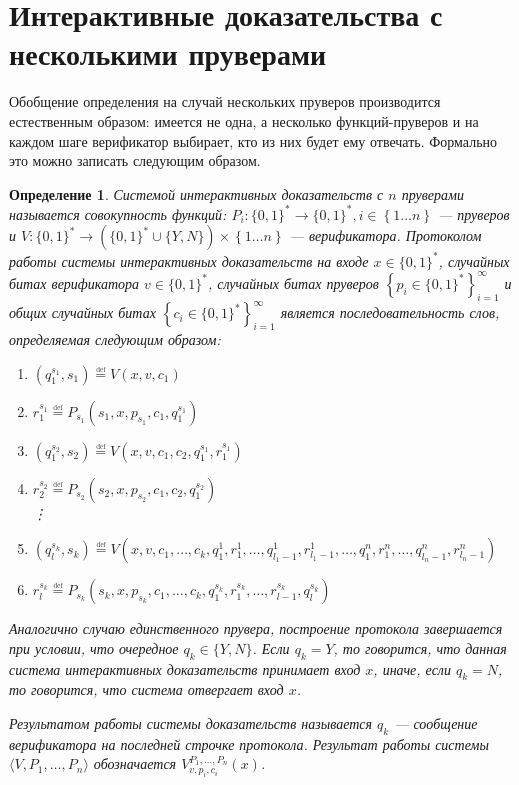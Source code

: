 \documentclass[14pt, a4paper]{extreport}
\newtheorem{definition}{\indent Определение}
\newcommand{\word}{\{0, 1\}^*}
\newcommand{\defeq}{\overset{\underset{\mathrm{def}}{}}{=}}
\newcommand{\set}[1]{\left\{#1\right\}}
\begin{document}
\section{Интерактивные доказательства с несколькими пруверами}
Обобщение определения на случай нескольких пруверов производится естественным образом: имеется не одна, а несколько функций-пруверов и на каждом шаге верификатор выбирает, кто из них будет ему отвечать. Формально это можно записать следующим образом.
\begin{definition}\label{mip_system}
    Системой интерактивных доказательств с $n$ пруверами называется совокупность функций: $P_i: \word \longrightarrow \word, i \in \set{1\ldots n}$ --- пруверов и $V: \word \longrightarrow \left(\word \cup \{Y, N\}\right) \times \set{1 \dots n}$ --- верификатора. Протоколом работы системы интерактивных доказательств на входе $x \in \word$, случайных битах верификатора $v \in \word$, случайных битах пруверов $\left\{p_i\in \word\right\}_{i=1}^{\infty}$ и общих случайных битах $\left\{c_i\in \word\right\}_{i=1}^{\infty}$ является последовательность слов, определяемая следующим образом:
    \begin{enumerate}
        \item $(q^{s_1}_1, s_1) \defeq V(x, v, c_1)$
        \item $r^{s_1}_1 \defeq P_{s_1}(s_1, x, p_{s_1}, c_1, q^{s_1}_1)$
        \item $(q^{s_2}_1, s_2) \defeq V(x, v, c_1, c_2, q^{s_1}_1, r^{s_1}_1)$
        \item $r^{s_2}_2 \defeq P_{s_2}(s_2, x, p_{s_2}, c_1, c_2, q^{s_2}_1)$\\
            \vdots
        \item[(2k-1).] $(q^{s_k}_l, s_k) \defeq V(x, v, c_1, \ldots, c_k, q^1_1, r^1_1, \ldots, q^1_{l_1-1}, r^1_{l_1-1}, \ldots, q^n_1, r^n_1, \ldots, q^n_{l_n-1}, r^n_{l_n-1})$
        \item[(2k).] $r^{s_k}_l \defeq P_{s_k}(s_k, x, p_{s_k}, c_1, \ldots, c_k, q^{s_k}_1, r^{s_k}_1, \ldots, r^{s_k}_{l-1}, q^{s_k}_l)$
    \end{enumerate}
    Аналогично случаю единственного прувера, построение протокола завершается при условии, что очередное $q_k \in \{Y, N\}$. Если $q_k = Y$, то говорится, что данная система интерактивных доказательств принимает вход $x$, иначе, если $q_k = N$, то говорится, что система отвергает вход $x$.

    Результатом работы системы доказательств называется $q_k$ --- сообщение верификатора на последней строчке протокола. Результат работы системы $\langle V, P_1, \ldots, P_n\rangle$ обозначается $V^{P_1, \ldots, P_n}_{v, p_i, c_i}(x)$.
\end{definition}
\end{document}

